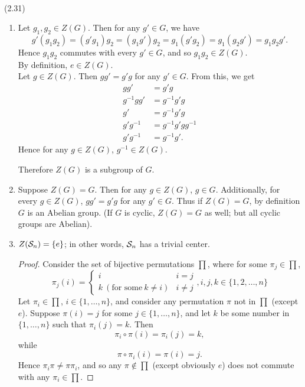 \documentclass{homework}
\begin{document}
\begin{solution}\\

  (2.31)
  \begin{enumerate}[label=(\alph*)]
    \item Let $g_1,g_2\in Z(G)$. Then for any $g'\in G$, we have \[
        g'(g_1g_2)=(g'g_1)g_2=(g_1g')g_2=g_1(g'g_2)=g_1(g_2g')=g_1g_2g'
      .\] Hence $ g_1g_2$ commutes with every $g'\in G$, and so $g_1g_2\in Z(G)$.\\
      By definition, $e\in Z(G)$.\\
      Let $g\in Z(G)$. Then $gg'=g'g$ for any $g'\in G$. From this, we get
      \begin{align*}
        gg'&= g'g \\
        g^{-1}gg'&=g^{-1}g'g\\
        g'&= g^{-1}g'g \\
        g'g^{-1}&= g^{-1}g'gg^{-1} \\
        g'g^{-1}&=g^{-1}g'
      .\end{align*} Hence for any $g\in Z(G)$, $g^{-1}\in Z(G)$.

      Therefore $Z(G)$ is a subgroup of $G$.
    \item Suppose $Z(G)=G$. Then for any $g\in Z(G)$, $g\in G$. Additionally, for every $g\in Z(G)$,
      $gg'=g'g$ for any $g'\in G$. Thus if $Z(G)=G$, by definition $G$ is an Abelian group. (If $G$ 
      is cyclic, $Z(G)=G$ as well; but all cyclic groups are Abelian).
    \item $Z(\mathcal{S}_n)=\{ e \}$; in other words, $\mathcal{S}_n$ has a trivial center.
      \begin{proof}[Proof]
        Consider the set of bijective permutations $\prod$, where for some $\pi_j\in \prod$, \[
          \pi_j(i)=\left\{ \begin{array}{lr} i&i=j\\k~(\text{for some}~k\neq i)&i\neq
          j\end{array}, i,j,k\in \{ 1,2,\ldots,n \}\right.
            \] Let $\pi_i \in \prod$, $i\in \{ 1,\ldots,n \}$, and consider any permutation $\pi$
            not in $\prod$ (except $e$). Suppose $\pi(i)=j$ for some $j\in \{ 1,\ldots,n \}$, and
            let $k$ be some number in $\{ 1,\ldots,n \}$ such that $\pi_i(j)=k$. Then \[
              \pi_i\circ \pi(i) = \pi_i(j) = k
            ,\] while \[
              \pi\circ \pi_i(i) = \pi(i)=j
            .\] Hence $\pi_i\pi\neq \pi\pi_i$, and so any $\pi\not\in \prod$ (except obviously
            $e$) does not commute with any $\pi_i\in \prod$.


\end{proof}
\end{enumerate}
\end{solution}
\end{document}
